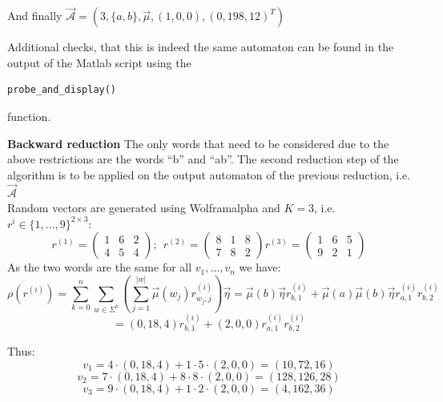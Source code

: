             
        And finally $\overrightarrow{\mathcal{A}} = (3, \{a, b\}, \overrightarrow{\mu}, (1,0,0), (0, 198, 12)^T)$

        Additional checks, that this is indeed the same automaton can be found in the output of the Matlab script using the \begin{verbatim}probe_and_display()\end{verbatim} function. 
        \newpage
        
        
        \textbf{Backward reduction} The only words that need to be considered due to the above restrictions are the words ``b'' and ``ab''. The second reduction step of the algorithm is to be applied on the output automaton of the previous reduction, i.e. $\overrightarrow{\mathcal{A}}$ \\
        Random vectors are generated using Wolframalpha and $K=3$, i.e. $r^{i} \in \{1, \dots, 9\}^{2 \times 3}$:
        \[  r^{(1)}= \begin{pmatrix}
                        1 & 6 & 2 \\
                        4 & 5 & 4
                    \end{pmatrix}; \ \
            r^{(2)}= \begin{pmatrix}
                        8 & 1 & 8 \\
                        7 & 8 & 2
                    \end{pmatrix} 
            r^{(3)}= \begin{pmatrix}
                        1 & 6 & 5 \\
                        9 & 2 & 1
                    \end{pmatrix}                      
        \]
        As the two words are the same for all $v_1, \dots, v_n$ we have:
        \[ \rho(r^{(i)}) = \sum_{k=0}^{n} \sum_{w \in \Sigma^k} \left(\sum_{j=1}^{|w|} \overrightarrow{\mu}(w_j) r^{(i)}_{w_j, j} \right) \overrightarrow{\eta} = \overrightarrow{\mu}(b) \overrightarrow{\eta} r^{(i)}_{b, 1}  + \overrightarrow{\mu}(a) \overrightarrow{\mu}(b) \overrightarrow{\eta} r^{(i)}_{a, 1} r^{(i)}_{b, 2}  \]
        \[ = (0, 18, 4) r^{(i)}_{b, 1} + (2,0,0) r^{(i)}_{a, 1} r^{(i)}_{b, 2} \]
        
        Thus:
        \[ v_1 = 4 \cdot (0,18,4) + 1 \cdot 5 \cdot (2,0,0) = (10, 72, 16) \]
        \[ v_2 = 7 \cdot (0,18,4) + 8 \cdot 8 \cdot (2,0,0) = (128, 126, 28) \]
        \[ v_3 = 9 \cdot (0,18,4) + 1 \cdot 2 \cdot (2,0,0) = (4, 162, 36) \]
        
